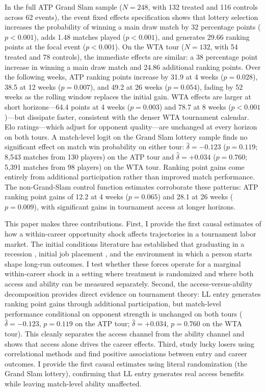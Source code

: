In the full ATP Grand Slam sample ($N = 248$, with 132 treated and 116 controls across 62 events), the event fixed effects specification shows that lottery selection increases the probability of winning a main draw match by 32 percentage points ($p < 0.001$), adds 1.48 matches played ($p < 0.001$), and generates 29.66 ranking points at the focal event ($p < 0.001$). On the WTA tour ($N = 132$, with 54 treated and 78 controls), the immediate effects are similar: a 38 percentage point increase in winning a main draw match and 24.86 additional ranking points. Over the following weeks, ATP ranking points increase by 31.9 at 4 weeks ($p = 0.028$), 38.5 at 12 weeks ($p = 0.007$), and 49.2 at 26 weeks ($p = 0.054$), fading by 52 weeks as the rolling window replaces the initial gain. WTA effects are larger at short horizons---64.4 points at 4 weeks ($p = 0.003$) and 78.7 at 8 weeks ($p < 0.001$)---but dissipate faster, consistent with the denser WTA tournament calendar. Elo ratings---which adjust for opponent quality---are unchanged at every horizon on both tours. A match-level logit on the Grand Slam lottery sample finds no significant effect on match win probability on either tour: $\hat{\delta} = -0.123$ ($p = 0.119$; 8,543 matches from 130 players) on the ATP tour and $\hat{\delta} = +0.034$ ($p = 0.760$; 5,391 matches from 98 players) on the WTA tour. Ranking point gains come entirely from additional participation rather than improved match performance. The non-Grand-Slam control function estimates corroborate these patterns: ATP ranking point gains of 12.2 at 4 weeks ($p = 0.065$) and 28.1 at 26 weeks ($p = 0.009$), with significant gains in tournament access at longer horizons.

This paper makes three contributions. First, I provide the first causal estimates of how a within-career opportunity shock affects trajectories in a tournament labor market. The initial conditions literature has established that graduating in a recession \citep{Oreopoulos2012_graduating_recession}, initial job placement \citep{Oyer2006_initial_placement}, and the environment in which a person starts \citep{Chetty2014_where_is_land} shape long-run outcomes. I test whether these forces operate for a marginal within-career shock in a setting where treatment is randomized and where both access and ability can be measured separately. Second, the access-versus-ability decomposition provides direct evidence on tournament theory: LL entry generates ranking point gains through additional participation, but match-level performance conditional on opponent strength is unchanged on both tours ($\hat{\delta} = -0.123$, $p = 0.119$ on the ATP tour; $\hat{\delta} = +0.034$, $p = 0.760$ on the WTA tour). This cleanly separates the access channel from the ability channel and shows that access alone drives the career effects. Third, \citet{Maity2025_early_career_sports} study lucky losers using correlational methods and find positive associations between entry and career outcomes. I provide the first causal estimates using literal randomization (the Grand Slam lottery), confirming that LL entry generates real access benefits while leaving match-level ability unaffected.

